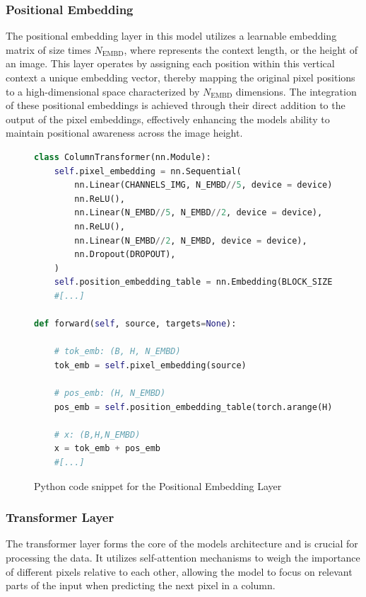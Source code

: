     \subsubsection{Positional Embedding}
    \label{sec:CIT_PositionalEmbedding}

    The positional embedding layer in this model utilizes a learnable embedding matrix of size  times \(N_{\text{EMBD}}\), where  represents the context length, or the height of an image. This layer operates by assigning each position within this vertical context a unique embedding vector, thereby mapping the original pixel positions to a high-dimensional space characterized by \(N_{\text{EMBD}}\) dimensions. The integration of these positional embeddings is achieved through their direct addition to the output of the pixel embeddings, effectively enhancing the models ability to maintain positional awareness across the image height.


\begin{figure}[H]
    \centering
    \begin{lstlisting}[language=Python]
class ColumnTransformer(nn.Module):
    self.pixel_embedding = nn.Sequential(
        nn.Linear(CHANNELS_IMG, N_EMBD//5, device = device),
        nn.ReLU(),
        nn.Linear(N_EMBD//5, N_EMBD//2, device = device),
        nn.ReLU(),
        nn.Linear(N_EMBD//2, N_EMBD, device = device),
        nn.Dropout(DROPOUT),
    )
    self.position_embedding_table = nn.Embedding(BLOCK_SIZE, N_EMBD)
    #[...]

def forward(self, source, targets=None):

    # tok_emb: (B, H, N_EMBD)
    tok_emb = self.pixel_embedding(source) 

    # pos_emb: (H, N_EMBD)
    pos_emb = self.position_embedding_table(torch.arange(H)) 

    # x: (B,H,N_EMBD)
    x = tok_emb + pos_emb 
    #[...]
\end{lstlisting}
\caption{Python code snippet for the Positional Embedding Layer}
\label{fig:posEmbend_CIT}
\end{figure}
   
    \subsubsection{Transformer Layer}
    \label{sec:transformer_CIT}

    The transformer layer forms the core of the models architecture and is crucial for processing the data. It utilizes self-attention mechanisms \autocite{vaswani2023attention} to weigh the importance of different pixels relative to each other, allowing the model to focus on relevant parts of the input when predicting the next pixel in a column. 

